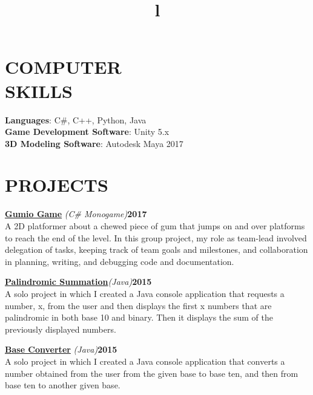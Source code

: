 \documentclass[line,margin]{res}
\begin{document}
\begin{resume}
\section{COMPUTER\\SKILLS}
\textbf{Languages}: C\#, C++, Python, Java\\
\textbf{Game Development Software}: Unity 5.x\\
\textbf{3D Modeling Software}: Autodesk Maya 2017
\section{PROJECTS}
\par
    \href{https://github.com/MaeveMonster/GumioGame}{\textbf{Gumio Game}}
    {\sl (C\# Monogame)}\hfill \textbf{2017}\\ 
    A 2D platformer about a chewed piece of gum that jumps on and over platforms to 
	reach the end of the level. In this group project, my role as team-lead involved delegation of tasks, keeping track of team goals and milestones, and collaboration in planning, writing, and debugging code and documentation.
\par
    \href{https://github.com/MaeveMonster/PalindromicSummation}
    {\textbf{Palindromic Summation}}{\sl (Java)}\hfill \textbf{2015}\\
    A solo project in which I created a Java console application that requests a number, x, from the user and then displays the first x numbers that are palindromic in both base 10 and binary. Then it displays the sum of the previously displayed numbers.
\par
    \href{https://github.com/MaeveMonster/BaseConverter}{\textbf{Base Converter}}
    {\sl (Java)}\hfill \textbf{2015}\\ 
    A solo project in which I created a Java console application that converts a number obtained from the user from the given base to base ten, and then from base ten to another given base.

\begin{format}
\title{l}\\
\\
\body\\
\end{format}

\end{resume}
\end{document}
